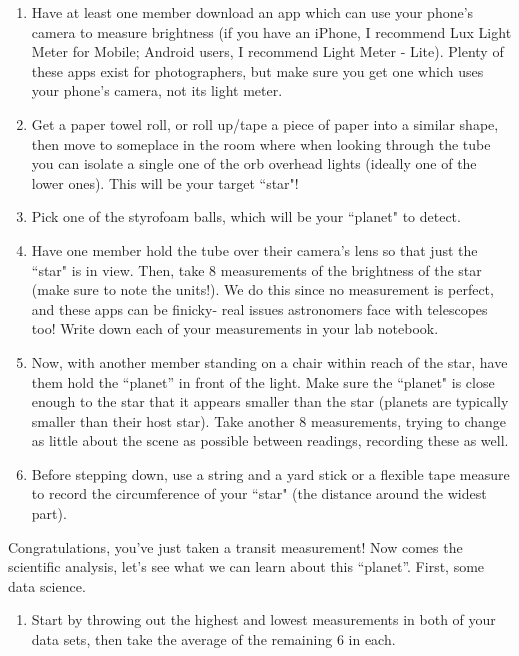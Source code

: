 \documentclass[12pt]{article}
\begin{document}
\begin{enumerate}[label=\textbf{Step \arabic*:}]
    \item Have at least one member download an app which can use your phone’s camera to measure brightness (if you have an iPhone, I recommend Lux Light Meter for Mobile; Android users, I recommend Light Meter - Lite). Plenty of these apps exist for photographers, but make sure you get one which uses your phone’s camera, not its light meter.
    
    \item Get a paper towel roll, or roll up/tape a piece of paper into a similar shape, then move to someplace in the room where when looking through the tube you can isolate a single one of the orb overhead lights (ideally one of the lower ones). This will be your target ``star"!
    
    \item Pick one of the styrofoam balls, which will be your ``planet" to detect.
    
    \item Have one member hold the tube over their camera’s lens so that just the ``star" is in view. Then, take 8 measurements of the brightness of the star (make sure to note the units!). We do this since no measurement is perfect, and these apps can be finicky- real issues astronomers face with telescopes too! Write down each of your measurements in your lab notebook.
    
    \item Now, with another member standing on a chair within reach of the star, have them hold the “planet” in front of the light. Make sure the ``planet" is close enough to the star that it appears smaller than the star (planets are typically smaller than their host star). Take another 8 measurements, trying to change as little about the scene as possible between readings, recording these as well.
    
    \item Before stepping down, use a string and a yard stick or a flexible tape measure to record the circumference of your ``star" (the distance around the widest part).
\end{enumerate}

\noindent
Congratulations, you’ve just taken a transit measurement! Now comes the scientific analysis, let’s see what we can learn about this “planet”. First, some data science. 
\begin{enumerate}[label=\textbf{Step \arabic*:},resume]
    \item Start by throwing out the highest and lowest measurements in both of your data sets, then take the average of the remaining 6 in each.
\end{enumerate}
\end{document}
